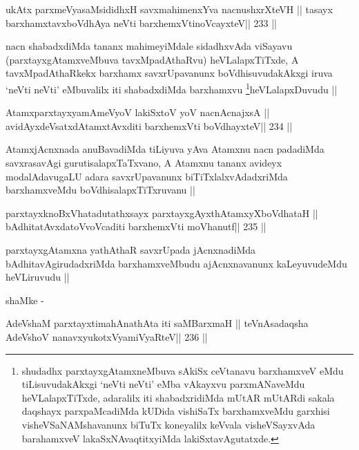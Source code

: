 \begin{shl}
ukAtx parxmeVyasaMsididhxH savxmahimenxYva nacnushxrXteVH ||
tasayx barxhamxtavxboVdhAya neVti barxhemxVtinoVcayxteV\hfill || 233 ||
\end{shl}

\begin{artha}
nacn shabadxdiMda tananx mahimeyiMdale sidadhxvAda viSayavu
(parxtayxgAtamxveMbuva tavxMpadAthaRvu) heVLalapxTiTxde, A
tavxMpadAthaRkekx barxhamx savxrUpavanunx boVdhisuvudakAkxgi iruva
`neVti neVti' eMbuvalilx iti shabadxdiMda
barxhamxvu \footnote[2]{shudadhx parxtayxgAtamxneMbuva sAkiSx
  ceVtanavu barxhamxveV eMdu tiLisuvudakAkxgi `neVti neVti' eMba
  vAkayxvu parxmANaveMdu heVLalapxTiTxde, adaralilx iti shabadxridiMda
  mUtAR mUtARdi sakala daqshayx parxpaMcadiMda kUDida vishiSaTx
  barxhamxveMdu garxhisi visheVSaNAMshavanunx biTuTx koneyalilx
  keVvala visheVSayxvAda barahamxveV lakaSxNAvaqtitxyiMda lakiSxtavAgutatxde.}heVLalapxDuvudu ||
\end{artha}

\begin{shl}
AtamxparxtayxyamAmeVyoV lakiSxtoV yoV nacnA\s cnajxsA ||
avidAyxdeVsatxdAtamxtAvxditi barxhemxVti boVdhayxteV\hfill || 234 ||
\end{shl}

\begin{artha}
AtamxjAcnxnada anuBavadiMda tiLiyuva yAva Atamxnu nacn padadiMda
savxrasavAgi gurutisalapxTaTxvano, A Atamxnu tananx avideyx
modalAdavugaLU adara savxrUpavanunx biTiTxlalxvAdadxriMda
barxhamxveMdu boVdhisalapxTiTxruvanu ||
\end{artha}

\begin{shl}
parxtayxknoBxVhatadutathxsayx parxtayxgAyxthAtamxyXboVdhataH ||
bAdhitatAvxdatoV\s voVcaditi barxhemxVti moVhanutf\hfill || 235 ||
\end{shl}

\begin{artha}
parxtayxgAtamxna yathAthaR savxrUpada jAcnxnadiMda
bAdhitavAgirudadxriMda barxhamxveMbudu ajAcnxnavanunx kaLeyuvudeMdu
heVLiruvudu ||

shaMke -
\end{artha}

\begin{shl}
\footnotemark[1]AdeVshaM parxtayxtimahAnathAta iti saMBarxmaH ||
teVnAsadaqsha AdeVshoV nanavxyukotxV\s yamiVyaRteV\hfill || 236 ||
\end{shl}

